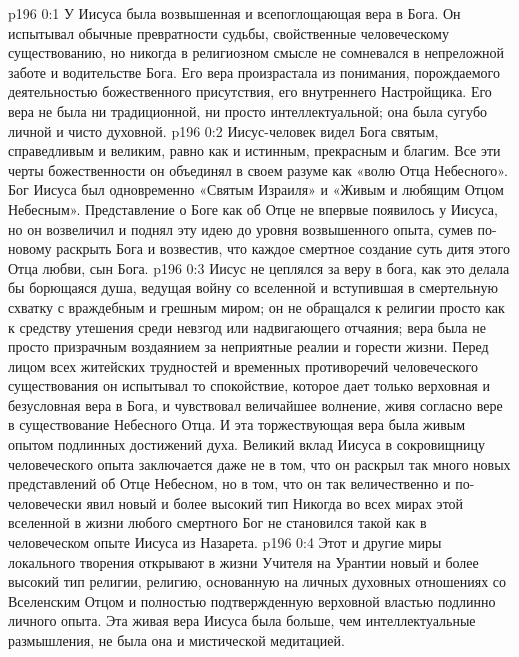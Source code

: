 \author{Комиссия срединников}
\vs p196 0:1 У Иисуса была возвышенная и всепоглощающая вера в Бога. Он испытывал обычные превратности судьбы, свойственные человеческому существованию, но никогда в религиозном смысле не сомневался в непреложной заботе и водительстве Бога. Его вера произрастала из понимания, порождаемого деятельностью божественного присутствия, его внутреннего Настройщика. Его вера не была ни традиционной, ни просто интеллектуальной; она была сугубо личной и чисто духовной.
\vs p196 0:2 Иисус\hyp{}человек видел Бога святым, справедливым и великим, равно как и истинным, прекрасным и благим. Все эти черты божественности он объединял в своем разуме как «волю Отца Небесного». Бог Иисуса был одновременно «Святым Израиля» и «Живым и любящим Отцом Небесным». Представление о Боге как об Отце не впервые появилось у Иисуса, но он возвеличил и поднял эту идею до уровня возвышенного опыта, сумев по\hyp{}новому раскрыть Бога и возвестив, что каждое смертное создание суть дитя этого Отца любви, сын Бога.
\vs p196 0:3 Иисус не цеплялся за веру в бога, как это делала бы борющаяся душа, ведущая войну со вселенной и вступившая в смертельную схватку с враждебным и грешным миром; он не обращался к религии просто как к средству утешения среди невзгод или надвигающего отчаяния; вера была не просто призрачным воздаянием за неприятные реалии и горести жизни. Перед лицом всех житейских трудностей и временных противоречий человеческого существования он испытывал то спокойствие, которое дает только верховная и безусловная вера в Бога, и чувствовал величайшее волнение, живя согласно вере в существование Небесного Отца. И эта торжествующая вера была живым опытом подлинных достижений духа. Великий вклад Иисуса в сокровищницу человеческого опыта заключается даже не в том, что он раскрыл так много новых представлений об Отце Небесном, но в том, что он так величественно и по\hyp{}человечески явил новый и более высокий тип  Никогда во всех мирах этой вселенной в жизни любого смертного Бог не становился такой  как в человеческом опыте Иисуса из Назарета.
\vs p196 0:4 Этот и другие миры локального творения открывают в жизни Учителя на Урантии новый и более высокий тип религии, религию, основанную на личных духовных отношениях со Вселенским Отцом и полностью подтвержденную верховной властью подлинно личного опыта. Эта живая вера Иисуса была больше, чем интеллектуальные размышления, не была она и мистической медитацией.
